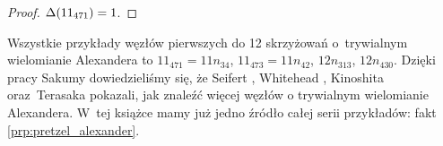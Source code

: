 \begin{proof}
    $\Delta(11_{471}) = 1$.
\end{proof}

Wszystkie przykłady węzłów pierwszych do 12 skrzyżowań o~trywialnym wielomianie Alexandera to $11_{471} = 11n_{34}$, $11_{473} = 11n_{42}$, $12n_{313}$, $12n_{430}$.
Dzięki pracy Sakumy \cite{sakuma2020} dowiedzieliśmy się, że Seifert \cite{seifert1935}, Whitehead \cite{whitehead1937}, Kinoshita oraz~Terasaka \cite{kinoshita1957} pokazali, jak znaleźć więcej węzłów o trywialnym wielomianie Alexandera.
%
%
%
%
%
W~tej książce mamy już jedno źródło całej serii przykładów: fakt \ref{prp:pretzel_alexander}.

